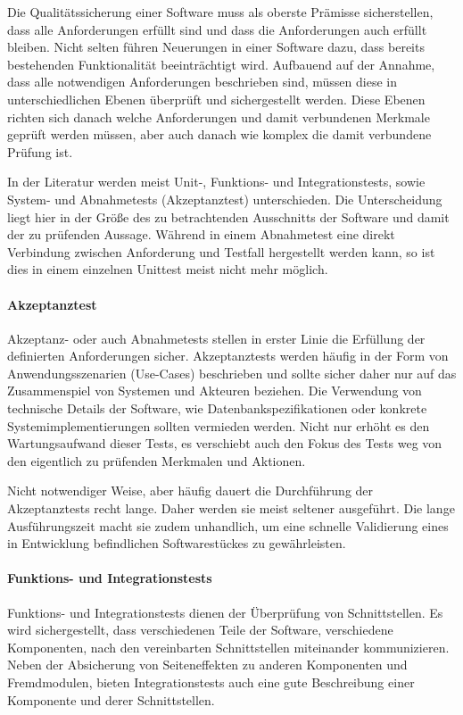 \documentclass[12pt,a4paper]{book}
\begin{document}
Die Qualitätssicherung einer Software muss als oberste Prämisse sicherstellen, dass alle Anforderungen erfüllt sind und dass die Anforderungen auch erfüllt bleiben. Nicht selten führen Neuerungen in einer Software dazu, dass bereits bestehenden Funktionalität beeinträchtigt wird. 
Aufbauend auf der Annahme, dass alle notwendigen Anforderungen beschrieben sind, müssen diese in unterschiedlichen Ebenen überprüft und sichergestellt werden.
Diese Ebenen richten sich danach welche Anforderungen und damit verbundenen Merkmale geprüft werden müssen, aber auch danach wie komplex die damit verbundene Prüfung ist.

In der Literatur werden meist Unit-, Funktions- und Integrationstests, sowie System- und Abnahmetests (Akzeptanztest) unterschieden.
Die Unterscheidung liegt hier in der Größe des zu betrachtenden Ausschnitts der Software und damit der zu prüfenden Aussage. Während in einem Abnahmetest eine direkt Verbindung zwischen Anforderung und Testfall hergestellt werden kann, so ist dies in einem einzelnen Unittest meist nicht mehr möglich.
\paragraph{Akzeptanztest}
Akzeptanz- oder auch Abnahmetests stellen in erster Linie die Erfüllung der definierten Anforderungen sicher. Akzeptanztests werden häufig in der Form von Anwendungsszenarien (Use-Cases) beschrieben und sollte sicher daher nur auf das Zusammenspiel von Systemen und Akteuren beziehen. Die Verwendung von technische Details der Software, wie Datenbankspezifikationen oder konkrete Systemimplementierungen sollten vermieden werden. Nicht nur erhöht es den Wartungsaufwand dieser Tests, es verschiebt auch den Fokus des Tests weg von den eigentlich zu prüfenden Merkmalen und Aktionen.

Nicht notwendiger Weise, aber häufig dauert die Durchführung der Akzeptanztests recht lange. Daher werden sie meist seltener ausgeführt. Die lange Ausführungszeit macht sie zudem unhandlich, um eine schnelle Validierung eines in Entwicklung befindlichen Softwarestückes zu gewährleisten.

\paragraph{Funktions- und Integrationstests}

Funktions- und Integrationstests dienen der Überprüfung von Schnittstellen. Es wird sichergestellt, dass verschiedenen Teile der Software, verschiedene Komponenten, nach den vereinbarten Schnittstellen miteinander kommunizieren.
Neben der Absicherung von Seiteneffekten zu anderen Komponenten und Fremdmodulen, bieten Integrationstests auch eine gute Beschreibung einer Komponente und derer Schnittstellen.
\end{document}
